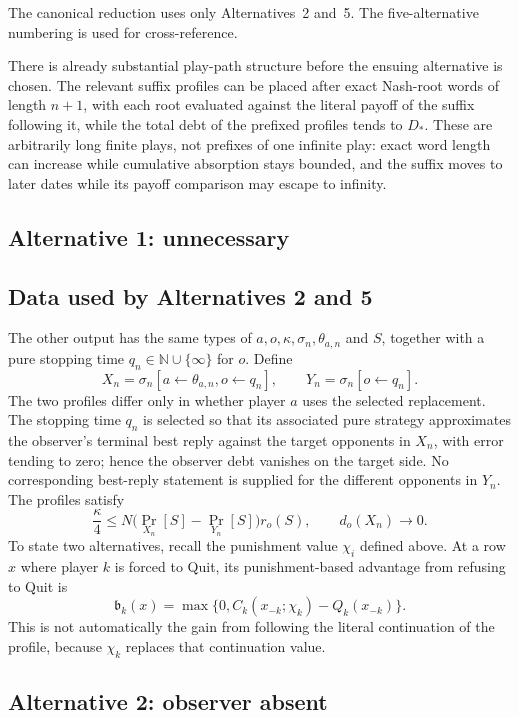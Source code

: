 \documentclass[11pt]{article}
\begin{document}
The canonical reduction uses only Alternatives~2 and~5.  The five-alternative
numbering is used for cross-reference.

There is already substantial play-path structure before the ensuing alternative is
chosen.  The relevant suffix profiles can be placed after exact Nash-root
words of length $n+1$, with each root evaluated against the literal payoff
of the suffix following it, while the total debt of the prefixed profiles
tends to $D_*$.  These are arbitrarily long finite plays, not prefixes of one
infinite play: exact word length can increase while cumulative absorption
stays bounded, and the suffix moves to later dates while its payoff comparison
may escape to infinity.

\subsection{Alternative 1: unnecessary}
\label{alt:direct-comparison}

\subsection*{Data used by Alternatives 2 and 5}
\label{alt:shared-data}

The other output has the same types of $a,o,\kappa,\sigma_n,\theta_{a,n}$
and $S$, together with a pure stopping time
$q_n\in\mathbb N\cup\{\infty\}$ for $o$.  Define
\[
 X_n=\sigma_n[a\leftarrow\theta_{a,n},o\leftarrow q_n],
 \qquad
 Y_n=\sigma_n[o\leftarrow q_n].
\]
The two profiles differ only in whether player $a$ uses the selected
replacement.  The stopping time $q_n$ is selected so that its associated
pure strategy approximates the observer's terminal best reply against the
target opponents in $X_n$, with error tending to zero; hence the observer
debt vanishes on the target side.  No corresponding best-reply statement is
supplied for the different opponents in $Y_n$.  The profiles satisfy
\[
 \frac{\kappa}{4}
 \le N\bigl(\Pr_{X_n}[S]-\Pr_{Y_n}[S]\bigr)r_o(S),
 \qquad d_o(X_n)\longrightarrow0.
\]
To state two alternatives, recall the punishment value $\chi_i$ defined
above.
At a row $x$ where player $k$ is forced to Quit, its punishment-based
advantage from refusing to Quit is
\[
 \mathfrak b_k(x)
 =\max\{0,C_k(x_{-k};\chi_k)-Q_k(x_{-k})\}.
\]
This is not automatically the gain from following the literal continuation
of the profile, because $\chi_k$ replaces that continuation value.

\subsection{Alternative 2: observer absent}
\label{alt:observer-absent}
\end{document}
